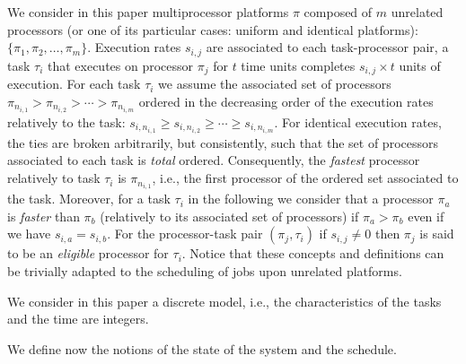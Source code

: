 \documentclass[a4paper,11pt]{article}
\begin{document}
We consider in this paper multiprocessor platforms $\pi$
composed of $m$ unrelated processors (or one of its
particular cases: uniform and identical platforms):
$\{\pi_1,
\pi_2, \ldots, \pi_m \}$. Execution rates $s_{i,j}$ are
associated to each task-processor pair, a task $\tau_i$ that
executes on processor $\pi_j$ for $t$ time units completes
$s_{i,j} \times t$ units of execution. For each task
$\tau_i$ we assume the associated set of processors
$\pi_{n_{i,1}} > \pi_{n_{i,2}} > \cdots > \pi_{n_{i,m}} $
ordered in the decreasing order of the execution rates
relatively to the task: $s_{i,n_{i,1}} \geq s_{i,n_{i,2}}
\geq \cdots \geq s_{i,n_{i,m}}$. For identical execution
rates, the ties are broken arbitrarily, but consistently,
such that the set of processors associated to each task is
\emph{total} ordered. Consequently, the \emph{fastest} processor
relatively to task $\tau_{i}$ is $\pi_{n_{i,1}}$, i.e., the
first processor of the ordered set associated to the task.
Moreover, for a task $\tau_i$ in the following we consider
that a processor $\pi_{a}$ is {\em faster} than $\pi_{b}$ (relatively to its associated set of processors) if $\pi_{a} >\pi_{b}$ even if we have $s_{i,a} =
s_{i,b}$. For the processor-task pair $(\pi_j, \tau_i)$ if
$s_{i,j} \neq 0$ then $\pi_j$ is said to be an \emph{eligible} processor
for $\tau_i$. Notice that these concepts and definitions
can be trivially adapted to the scheduling of jobs upon
unrelated platforms. 

We consider in this paper a discrete model, i.e., the characteristics
of the tasks and the time are integers. 



We define now the notions of the state of the system and the schedule.
\end{document}
